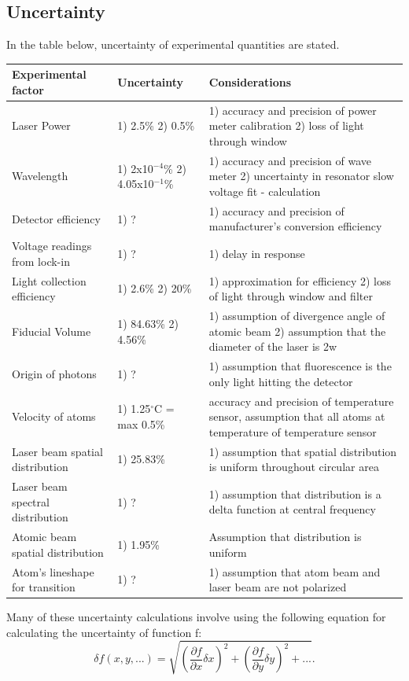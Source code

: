 \documentclass[12pt, a4paper]{article}
\begin{document}
\subsection{Uncertainty}
In the table below, uncertainty of experimental quantities are stated.
\begin{center}
\begin{tabular}{||p{3cm}|p{3cm}|p{8cm}||}
\hline
Experimental factor & Uncertainty & Considerations\\
\hline\hline
 Laser Power & 1) 2.5\% 2) 0.5\% & 1) accuracy and precision of power meter calibration 2) loss of light through window\\
\hline
 Wavelength & 1) 2x10$^{-4}$\%  2) 4.05x10$^{-1}$\%& 1) accuracy and precision of wave meter 2) uncertainty in resonator slow voltage fit - calculation\\
\hline
 Detector efficiency & 1) ? & 1) accuracy and precision of manufacturer's conversion efficiency\\
\hline 
 Voltage readings from lock-in & 1) ? & 1) delay in response \\
\hline
 Light collection efficiency & 1) 2.6\% 2) 20\%& 1) approximation for efficiency 2) loss of light through window and filter\\
\hline
 Fiducial Volume & 1) 84.63\% 2) 4.56\% & 1) assumption of divergence angle of atomic beam 2) assumption that the diameter of the laser is 2w\\
\hline
 Origin of photons &  1) ? & 1) assumption that fluorescence is the only light hitting the detector\\
\hline
 Velocity of atoms & 1) 1.25$^{\circ}$C = max 0.5\% & accuracy and precision of temperature sensor, assumption that all atoms at temperature of temperature sensor \\
\hline
 Laser beam spatial distribution & 1) 25.83\% & 1) assumption that spatial distribution is uniform throughout circular area \\
\hline
 Laser beam spectral distribution & 1) ? & 1) assumption that distribution is a delta function at central frequency \\
\hline
 Atomic beam spatial distribution & 1) 1.95\% & Assumption that distribution is uniform \\
 \hline
 Atom's lineshape for transition & 1) ?  & 1) assumption that atom beam and laser beam are not polarized\\
 \hline
\end{tabular}
\end{center}
Many of these uncertainty calculations involve using the following equation for calculating the uncertainty of function f:
\begin{equation}
\delta f(x,y,...) = \sqrt{(\frac{\partial f}{\partial x}\delta x)^2 + (\frac{\partial f}{\partial y}\delta y)^2 + ... }.
\end{equation}
\end{document}
